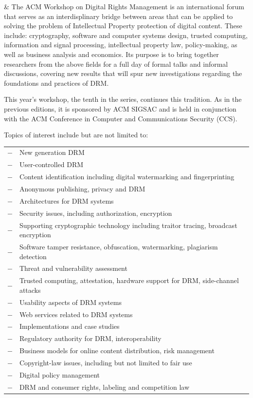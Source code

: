 \documentclass{article}
\begin{document}
\begin{tabularx}{\linewidth}
&
  The ACM Workshop on Digital Rights Management is an international
  forum that serves as an interdisplinary bridge between areas that
  can be applied to solving the problem of Intellectual Property
  protection of digital content. These include: cryptography, software
  and computer systems design, trusted computing, information and
  signal processing, intellectual property law, policy-making, as well
  as business analysis and economics. Its purpose is to bring together
  researchers from the above fields for a full day of formal talks and
  informal discussions, covering new results that will spur new
  investigations regarding the foundations and practices of
  DRM.\par\medskip 

  This year's workshop, the tenth in the series, continues this
  tradition. As in the previous editions, it is sponsored by ACM
  SIGSAC and is held in conjunction with the ACM Conference in
  Computer and Communications Security (CCS).\par\medskip

  Topics of interest include but are not limited to:\par\smallskip
  {\small
  \begin{tabular}{l@{\thinspace}p{.92\hsize}}
    $-$ &  New generation DRM\\
    $-$ & User-controlled DRM\\
    $-$ & Content identification including digital watermarking and
    fingerprinting\\ 
    $-$ & Anonymous publishing, privacy and DRM\\
    $-$ & Architectures for DRM systems\\
    $-$ & Security issues, including authorization, encryption\\
    $-$ & Supporting cryptographic technology including traitor
    tracing, broadcast encryption\\ 
    $-$ & Software tamper resistance, obfuscation, watermarking,
    plagiarism detection\\ 
    $-$ & Threat and vulnerability assessment\\
    $-$ & Trusted computing, attestation, hardware support for DRM,
    side-channel attacks\\ 
    $-$ & Usability aspects of DRM systems\\
    $-$ & Web services related to DRM systems\\
    $-$ & Implementations and case studies\\
    $-$ & Regulatory authority for DRM, interoperability\\
    $-$ & Business models for online content distribution, risk management\\
    $-$ & Copyright-law issues, including but not limited to fair use\\
    $-$ & Digital policy management\\
    $-$ & DRM and consumer rights, labeling and competition law
  \end{tabular}}\par\medskip



\end{tabularx}
\end{document}

